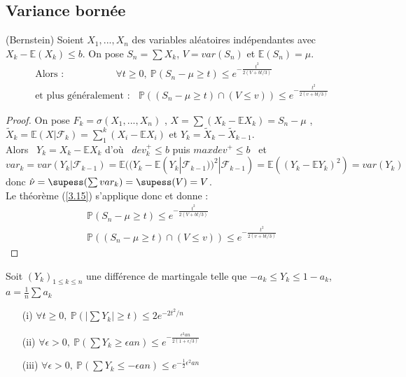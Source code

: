 \subsection{Variance bornée}

\begin{theorem} (Bernstein)
\label{Bernstein}
Soient $X_1,...,X_n$ des variables aléatoires indépendantes avec $X_k-\mathbb{E}(X_k) \leq b$. On pose $S_n=\sum X_k$, $V=var(S_n)$ et $\mathbb{E}(S_n)=\mu$.
\begin{eqnarray*}
\mbox{Alors :~~~~~~~~~~~~~~~~}
\forall t \geq 0,~ \mathbb{P}(S_n-\mu \geq t) \leq e^{-\frac{t^2}{2(V+bt/3)}}\\
\mbox{et plus généralement :}~~~~ \mathbb{P}((S_n-\mu \geq t)\cap(V \leq v)) \leq e^{-\frac{t^2}{2(v+bt/3)}} 
\end{eqnarray*} 
\end{theorem}
\begin{proof}
On pose $F_k=\sigma(X_1,...,X_n)$ , $X=\sum (X_k-\mathbb{E}X_k) =S_n-\mu$ , $\tilde X_k=\mathbb{E}(X|\mathcal{F}_k)=\sum_{1}^{k}(X_i-\mathbb{E}X_i)$ et $Y_k=\tilde X_k - \tilde X_{k-1}$.\\
Alors~ $Y_k= X_k-\mathbb{E}X_k$ 
d'où~  $dev_k^+ \leq b$ puis $maxdev^+ \leq b $~ 
et $var_k=var(Y_k|\mathcal{F}_{k-1})=\mathbb{E}((Y_k-\mathbb{E}(Y_k|\mathcal{F}_{k-1}))^2|\mathcal{F}_{k-1})=\mathbb{E}((Y_k-\mathbb{E}Y_k)^2)=var(Y_k)$
donc $\hat \nu = \supess(\sum var_k)=\supess(V)=V$.\\
Le théorème (\ref{3.15}) s'applique donc et donne :
\begin{eqnarray*}
\mathbb{P}(S_n-\mu \geq t) \leq e^{-\frac{t^2}{2(V+bt/3)}}\\
\mathbb{P}((S_n-\mu \geq t)\cap(V \leq v)) \leq e^{-\frac{t^2}{2(v+bt/3)}}
\end{eqnarray*}
 
\end{proof}

\begin{theorem}
\label{3.12}
Soit $(Y_k)_{1 \leq k \leq n}$ une différence de martingale telle que $-a_k \leq Y_k \leq 1-a_k$, $a=\frac{1}{n} \sum a_k$ 
\begin{itemize}
\item[(i)] $\forall t \geq 0,~\mathbb{P}(|\sum Y_k| \geq t) \leq 2e^{-2t^2/n}$  
\item[(ii)] $\forall \epsilon > 0,~ \mathbb{P}(\sum Y_k \geq \epsilon an) \leq e^{-\frac{\epsilon^2an}{2(1+\epsilon / 3)}}$
\item[(iii)] $\forall \epsilon > 0,~ \mathbb{P}(\sum Y_k \leq -\epsilon an) \leq e^{-\frac{1}{2}\epsilon ^2 an}$
\end{itemize}

\end{theorem}

